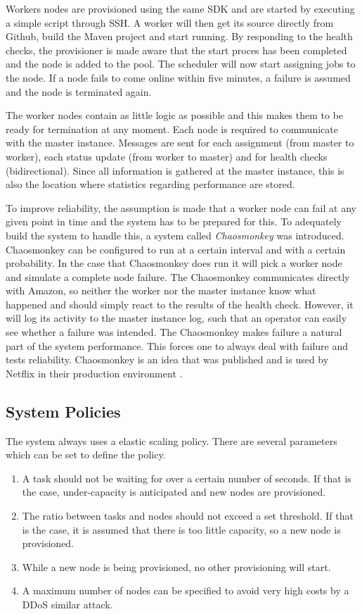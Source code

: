 \documentclass[a4paper]{IEEEtran}
\begin{document}
Workers nodes are provisioned using the same SDK and are started by executing a simple script through SSH.
A worker will then get its source directly from Github, build the Maven project and start running.
By responding to the health checks, the provisioner is made aware that the start proces has been completed and the node is added to the pool. 
The scheduler will now start assigning jobs to the node.
If a node fails to come online within five minutes, a failure is assumed and the node is terminated again.

The worker nodes contain as little logic as possible and this makes them to be ready for termination at any moment.
Each node is required to communicate with the master instance.
Messages are sent for each assignment (from master to worker), each status update (from worker to master) and for health checks (bidirectional).
Since all information is gathered at the master instance, this is also the location where statistics regarding performance are stored.

To improve reliability, the assumption is made that a worker node can fail at any given point in time
and the system has to be prepared for this.
To adequately build the system to handle this, a system called \textit{Chaosmonkey} was introduced.
Chaosmonkey can be configured to run at a certain interval and with a certain probability.
In the case that Chaosmonkey does run it will pick a worker node 
and simulate a complete node failure.
The Chaosmonkey communicates directly with Amazon, so neither the worker nor the master instance know what happened and should simply react to the results of the health check.
However, it will log its activity to the master instance log, such that an operator can easily see whether a failure was intended.
The Chaosmonkey makes failure a natural part of the system performance.
This forces one to always deal with failure and tests reliability.
Chaosmonkey is an idea that was published and is used by Netflix in their production environment \cite{Netflix-cm}.

\subsection{System Policies}

The system always uses a elastic scaling policy. There are several parameters which can be set to define the policy.

\begin{enumerate}
\item A task should not be waiting for over a certain number of seconds.
If that is the case, under-capacity is anticipated and new nodes are provisioned.
\item The ratio between tasks and nodes should not exceed a set threshold. 
If that is the case, it is assumed that there is too little capacity, so a new node is provisioned.
\item While a new node is being provisioned, no other provisioning will start.
\item A maximum number of nodes can be specified to avoid very high costs by a DDoS similar attack.
\end{enumerate}
\end{document}
